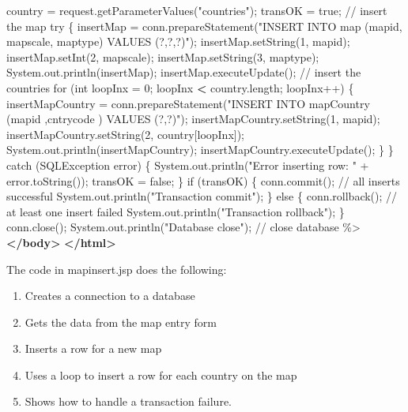 \documentclass[
]{article}
\newenvironment{Shaded}{\begin{snugshade}}{\end{snugshade}}
\newcommand{\ErrorTok}[1]{\textcolor[rgb]{0.64,0.00,0.00}{\textbf{#1}}}
\newcommand{\KeywordTok}[1]{\textcolor[rgb]{0.13,0.29,0.53}{\textbf{#1}}}
\newcommand{\NormalTok}[1]{#1}
\begin{document}
\begin{Shaded}
\begin{Highlighting}[]
\NormalTok{    country = request.getParameterValues("countries");}
\NormalTok{    transOK = true;}
\NormalTok{    // insert the map}
\NormalTok{    try \{}
\NormalTok{        insertMap = conn.prepareStatement("INSERT INTO map (mapid, mapscale, maptype) VALUES (?,?,?)");}
\NormalTok{        insertMap.setString(1, mapid);}
\NormalTok{        insertMap.setInt(2, mapscale);}
\NormalTok{        insertMap.setString(3, maptype);}
\NormalTok{        System.out.println(insertMap);}
\NormalTok{        insertMap.executeUpdate();}
\NormalTok{        // insert the countries}
\NormalTok{        for (int loopInx = 0; loopInx }\ErrorTok{\textless{}}\NormalTok{ country.length; loopInx++) \{}
\NormalTok{            insertMapCountry = conn.prepareStatement("INSERT INTO mapCountry (mapid ,cntrycode ) VALUES (?,?)");}
\NormalTok{            insertMapCountry.setString(1, mapid);}
\NormalTok{            insertMapCountry.setString(2, country[loopInx]);}
\NormalTok{            System.out.println(insertMapCountry);}
\NormalTok{            insertMapCountry.executeUpdate();}
\NormalTok{        \}}
\NormalTok{    \} catch (SQLException error) \{}
\NormalTok{        System.out.println("Error inserting row: " + error.toString());}
\NormalTok{        transOK = false;}
\NormalTok{    \}}
\NormalTok{    if (transOK) \{}
\NormalTok{        conn.commit(); // all inserts successful}
\NormalTok{        System.out.println("Transaction commit");}
\NormalTok{    \} else \{}
\NormalTok{        conn.rollback(); // at least one insert failed}
\NormalTok{        System.out.println("Transaction rollback");}
\NormalTok{    \}}
\NormalTok{    conn.close();}
\NormalTok{    System.out.println("Database close"); // close database}
\NormalTok{    \%\textgreater{}}
\KeywordTok{\textless{}/body\textgreater{}}
\KeywordTok{\textless{}/html\textgreater{}}
\end{Highlighting}
\end{Shaded}

The code in mapinsert.jsp does the following:

\begin{enumerate}
\def\labelenumi{\arabic{enumi}.}
\item
  Creates a connection to a database
\item
  Gets the data from the map entry form
\item
  Inserts a row for a new map
\item
  Uses a loop to insert a row for each country on the map
\item
  Shows how to handle a transaction failure.
\end{enumerate}
\end{document}

